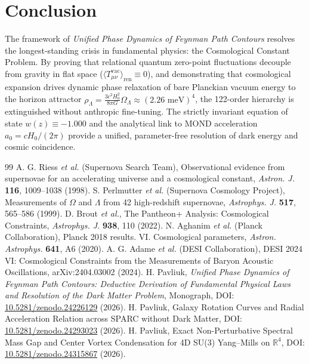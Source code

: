 \documentclass[11pt,a4paper]{article}
\begin{document}
\section{Conclusion}
The framework of \textit{Unified Phase Dynamics of Feynman Path Contours} resolves the longest-standing crisis in fundamental physics: the Cosmological Constant Problem. By proving that relational quantum zero-point fluctuations decouple from gravity in flat space ($\langle T_{\mu\nu}^{\mathrm{vac}} \rangle_{\mathrm{ren}} \equiv 0$), and demonstrating that cosmological expansion drives dynamic phase relaxation of bare Planckian vacuum energy to the horizon attractor $\rho_\Lambda = \frac{3 c^2 H_0^2}{8\pi G}\Omega_\Lambda \approx (2.26\text{ meV})^4$, the 122-order hierarchy is extinguished without anthropic fine-tuning. The strictly invariant equation of state $w(z) \equiv -1.000$ and the analytical link to MOND acceleration $a_0 = c H_0 / (2\pi)$ provide a unified, parameter-free resolution of dark energy and cosmic coincidence.

\begin{thebibliography}{99}
 A. G. Riess \textit{et al.} (Supernova Search Team), Observational evidence from supernovae for an accelerating universe and a cosmological constant, \textit{Astron. J.} \textbf{116}, 1009--1038 (1998).
 S. Perlmutter \textit{et al.} (Supernova Cosmology Project), Measurements of $\Omega$ and $\Lambda$ from 42 high-redshift supernovae, \textit{Astrophys. J.} \textbf{517}, 565--586 (1999).
 D. Brout \textit{et al.}, The Pantheon+ Analysis: Cosmological Constraints, \textit{Astrophys. J.} \textbf{938}, 110 (2022).
 N. Aghanim \textit{et al.} (Planck Collaboration), Planck 2018 results. VI. Cosmological parameters, \textit{Astron. Astrophys.} \textbf{641}, A6 (2020).
 A. G. Adame \textit{et al.} (DESI Collaboration), DESI 2024 VI: Cosmological Constraints from the Measurements of Baryon Acoustic Oscillations, arXiv:2404.03002 (2024).
 H. Pavliuk, \textit{Unified Phase Dynamics of Feynman Path Contours: Deductive Derivation of Fundamental Physical Laws and Resolution of the Dark Matter Problem}, Monograph, DOI: \href{https://doi.org/10.5281/zenodo.24226129}{10.5281/zenodo.24226129} (2026).
 H. Pavliuk, Galaxy Rotation Curves and Radial Acceleration Relation across SPARC without Dark Matter, DOI: \href{https://doi.org/10.5281/zenodo.24293023}{10.5281/zenodo.24293023} (2026).
 H. Pavliuk, Exact Non-Perturbative Spectral Mass Gap and Center Vortex Condensation for 4D SU(3) Yang--Mills on $\mathbb{R}^4$, DOI: \href{https://doi.org/10.5281/zenodo.24315867}{10.5281/zenodo.24315867} (2026).
\end{thebibliography}
\end{document}
